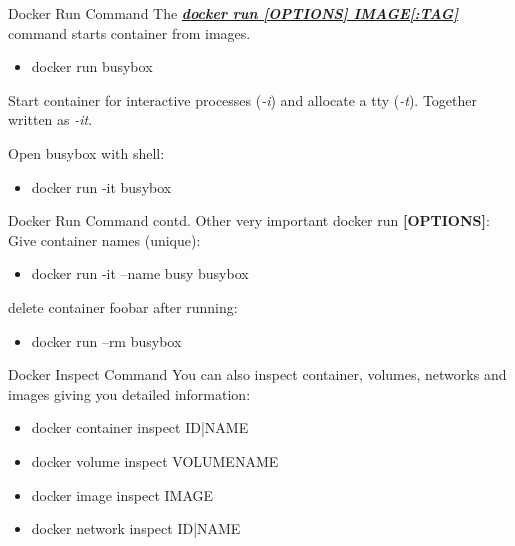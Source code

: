 \documentclass[10pt,aspectratio=\ratio,
compress
]{beamer}
\newcommand\meta{./meta}
\begin{document}
\begin{frame}{Docker Run Command}
The \href{https://docs.docker.com/engine/reference/run/}{\emph{\textbf{docker run [OPTIONS] IMAGE[:TAG]}}} command starts container from images.
\begin{itemize}
	\item docker run busybox
\end{itemize}
Start container for interactive processes (\emph{-i}) and allocate a tty (\emph{-t}). Together written as \emph{-it}.

Open busybox with shell:
\begin{itemize}
	\item docker run -it busybox
\end{itemize}


\end{frame}

\begin{frame}{Docker Run Command contd.}
Other very important docker run \textbf{[OPTIONS]}:
Give container names (unique):
\begin{itemize}
	\item docker run -it --name busy busybox
\end{itemize}
delete container foobar after running:
\begin{itemize}
	\item docker run --rm busybox
\end{itemize}
\end{frame}

\begin{frame}{Docker Inspect Command}
You can also inspect container, volumes, networks and images giving you detailed information:
\begin{itemize}
	\item docker container inspect ID|NAME
	\item docker volume inspect VOLUMENAME
	\item docker image inspect IMAGE
	\item docker network inspect ID|NAME
\end{itemize}

\end{frame}
\end{document}
